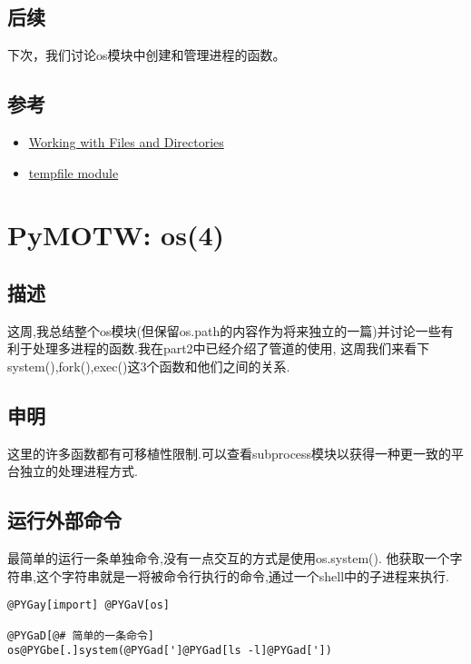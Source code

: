 \documentclass[a4paper,10pt,english]{manual}
\begin{document}
\subsection{后续}

下次，我们讨论os模块中创建和管理进程的函数。


\subsection{参考}
\begin{itemize}
\item {} 
\href{http://docs.python.org/lib/os-file-dir.html}{Working with Files and Directories}

\item {} 
\href{http://docs.python.org/lib/module-tempfile.html}{tempfile module}

\end{itemize}

\resetcurrentobjects

\clearpage
\section{PyMOTW: os(4)}


\subsection{描述}

这周,我总结整个os模块(但保留os.path的内容作为将来独立的一篇)并讨论一些有利于处理多进程的函数.我在part2中已经介绍了管道的使用, 这周我们来看下system(),fork(),exec()这3个函数和他们之间的关系.


\subsection{申明}

这里的许多函数都有可移植性限制.可以查看subprocess模块以获得一种更一致的平台独立的处理进程方式.


\subsection{运行外部命令}

最简单的运行一条单独命令,没有一点交互的方式是使用os.system(). 他获取一个字符串,这个字符串就是一将被命令行执行的命令,通过一个shell中的子进程来执行.

\begin{Verbatim}[commandchars=@\[\]]
@PYGay[import] @PYGaV[os]

@PYGaD[@# 简单的一条命令]
os@PYGbe[.]system(@PYGad[']@PYGad[ls -l]@PYGad['])
\end{Verbatim}
\end{document}
